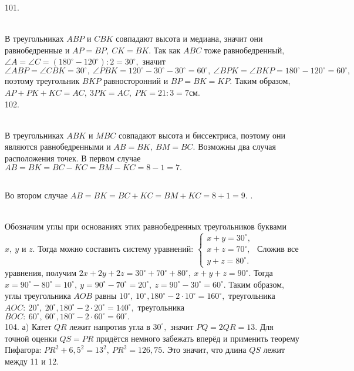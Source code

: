 101. \begin{figure}[ht!]
\end{figure}\\
В треугольниках $ABP$ и $CBK$ совпадают высота и медиана, значит они равнобедренные и $AP=BP,\ CK=BK.$ Так как $ABC$ тоже равнобедренный, $\angle A=\angle C=(180^\circ-120^\circ):2=30^\circ,$ значит $\angle ABP=\angle CBK=30^\circ,\ \angle PBK=120^\circ-30^\circ-30^\circ=60^\circ,\ \angle BPK=\angle BKP=180^\circ-120^\circ=60^\circ,$ поэтому треугольник $BKP$ равносторонний и $BP=BK=KP.$ Таким образом, $AP+PK+KC=AC,\ 3PK=AC,\ PK=21:3=7$см.\\
102. \begin{figure}[ht!]
\end{figure}\\
В треугольниках $ABK$ и $MBC$ совпадают высота и биссектриса, поэтому они являются равнобедренными и $AB=BK,\ BM=BC.$ Возможны два случая расположения точек. В первом случае $AB=BK=BC-KC=BM-KC=8-1=7.$
 \begin{figure}[ht!]
\end{figure}\\
Во втором случае $AB=BK=BC+KC=BM+KC=8+1=9.$\newpage
{}.\begin{figure}[ht!]
\end{figure}\\
Обозначим углы при основаниях этих равнобедренных треугольников буквами $x,\ y$ и $z.$ Тогда можно составить систему уравнений: $\begin{cases}x+y=30^\circ,\\
x+z=70^\circ,\\ y+z=80^\circ.\end{cases}$ Сложив все уравнения, получим $2x+2y+2z=30^\circ+70^\circ+80^\circ,\ x+y+z=90^\circ.$ Тогда $x=90^\circ-80^\circ=10^\circ,\ y=90^\circ-70^\circ=20^\circ,\ z=90^\circ-30^\circ=60^\circ.$ Таким образом, углы треугольника $AOB$ равны $10^\circ,\ 10^\circ, 180^\circ-2\cdot10^\circ=160^\circ,$ треугольника $AOC:\ 20^\circ,\ 20^\circ, 180^\circ-2\cdot20^\circ=140^\circ,$ треугольника $BOC:\ 60^\circ,\ 60^\circ, 180^\circ-2\cdot60^\circ=60^\circ.$\\
104. а) Катет $QR$ лежит напротив угла в $30^\circ,$ значит $PQ=2QR=13.$ Для точной оценки $QS=PR$ придётся немного забежать вперёд и применить теорему Пифагора: $PR^2+6,5^2=13^2,\ PR^2=126,75.$ Это значит, что длина $QS$ лежит между 11 и 12.\\
